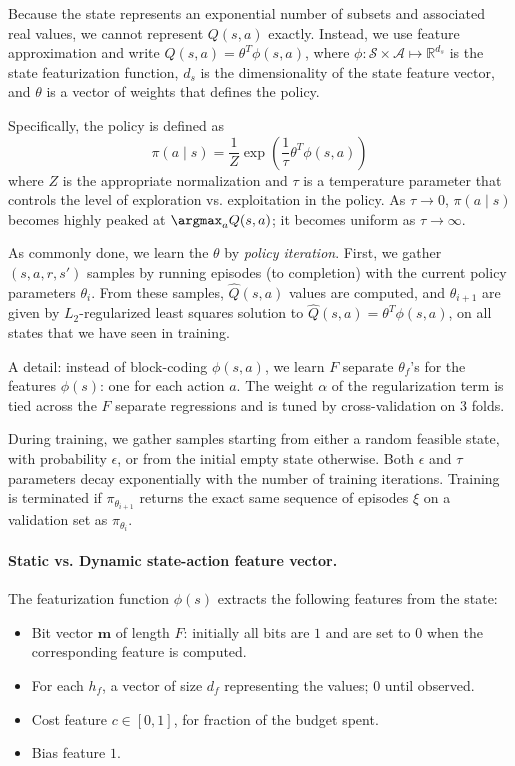 Because the state represents an exponential number of subsets and associated real values, we cannot represent $Q(s,a)$ exactly.
Instead, we use feature approximation and write $Q(s,a) = \theta^T \phi(s, a)$,  where $\phi: \mathcal{S} \times \mathcal{A} \mapsto \mathbb{R}^{d_s}$ is the state featurization function, $d_s$ is the dimensionality of the state feature vector, and $\theta$ is a vector of weights that defines the policy.

Specifically, the policy is defined as
\begin{equation}
\pi(a \mid s) = \frac{1}{Z} \exp\left(\frac{1}{\tau} \theta^T \phi(s, a)\right)
\end{equation}
where $Z$ is the appropriate normalization and $\tau$ is a temperature parameter that controls the level of exploration vs. exploitation in the policy.
As $\tau \rightarrow 0$, ${\pi(a \mid s)}$ becomes highly peaked at $\argmax_a Q(s,a)$; it becomes uniform as $\tau \rightarrow \infty$.

As commonly done, we learn the $\theta$ by \emph{policy iteration}.
First, we gather $(s, a, r, s')$ samples by running episodes (to completion) with the current policy parameters $\theta_i$.
From these samples, $\hat{Q}(s, a)$ values are computed, and $\theta_{i+1}$ are given by $L_2$-regularized least squares solution to $\hat{Q}(s, a) = \theta^T \phi(s, a)$, on all states that we have seen in training.


A detail: instead of block-coding $\phi(s,a)$, we learn $F$ separate $\theta_f$'s for the features $\phi(s)$: one for each action $a$.
The weight $\alpha$ of the regularization term is tied across the $F$ separate regressions and is tuned by cross-validation on 3 folds.

During training, we gather samples starting from either a random feasible state, with probability $\epsilon$, or from the initial empty state otherwise.
Both $\epsilon$ and $\tau$ parameters decay exponentially with the number of training iterations.
Training is terminated if $\pi_{\theta_{i+1}}$ returns the exact same sequence of episodes $\xi$ on a validation set as $\pi_{\theta_{i}}$.

\paragraph{Static vs. Dynamic state-action feature vector.}\label{sec:policy_features}
The featurization function $\phi(s)$ extracts the following features from the state:
\begin{itemize}\addtolength{\itemsep}{-.5\baselineskip}
\item Bit vector $\textbf{m}$ of length $F$: initially all bits are $1$ and are set to $0$ when the corresponding feature is computed.
\item For each $h_f$, a vector of size $d_f$ representing the values; $0$ until observed.
\item Cost feature $c \in [0, 1]$, for fraction of the budget spent.
\item Bias feature $1$.
\end{itemize}

